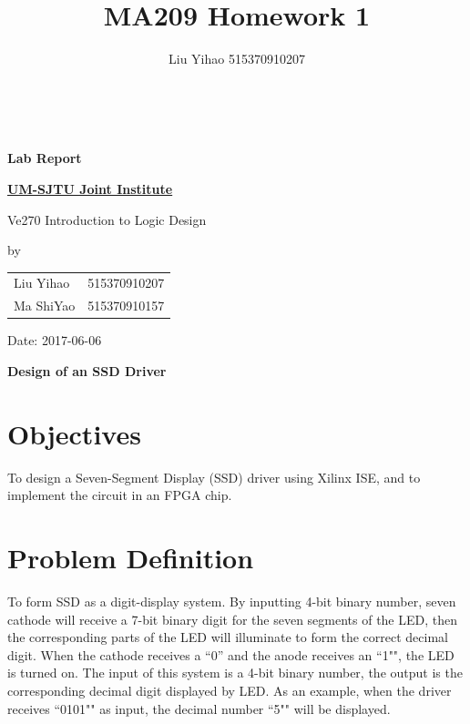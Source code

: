 \documentclass{article}
\title{MA209 Homework 1}
\author{Liu Yihao 515370910207}
\date{}
\begin{document}
\vspace*{3mm}

\begin{minipage}{0.6\linewidth}
\ 
\end{minipage}
\hfill
\begin{minipage}{0.38\linewidth}
\begin{center}
\huge\bfseries
Lab Report \\[8mm]
\fontsize{100pt}{\baselineskip}
\end{center}
\end{minipage}

\vspace*{1cm}

{\huge\bfseries
\uline{UM-SJTU Joint Institute \phantom{xxxxxxxxxxxx}}
\vspace*{2mm}

Ve270 Introduction to Logic Design
}	

\vspace*{2cm}
\begin{center}
\LARGE
by \\[2mm]
\begin{tabular}{ll}
Liu Yihao & 515370910207 \\
Ma ShiYao & 515370910157
\end{tabular}

\vspace*{2cm}
Date: 2017-06-06
\end{center}

\vspace*{2cm}
\begin{center}
\Huge\bfseries
Design of an SSD Driver
\end{center}

\newpage

\section{Objectives}
To design a Seven-Segment Display (SSD) driver using Xilinx ISE, and to implement the circuit in an FPGA chip.

\section{Problem Definition}
To form SSD as a digit-display system. By inputting 4-bit binary number, seven cathode will receive a 7-bit binary digit for the seven segments of the LED, then the corresponding parts of the LED will illuminate to form the correct decimal digit. When the cathode receives a ``0'' and the anode receives an ``1"", the LED is turned on. The input of this system is a 4-bit binary number, the output is the corresponding decimal digit displayed by LED. As an example, when the driver receives ``0101"" as input, the decimal number ``5"" will be displayed.
\end{document}
